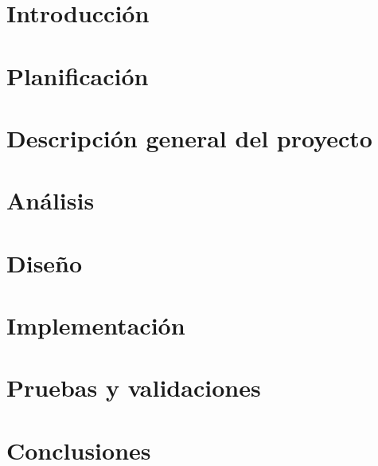 \documentclass[a4paper,11pt]{book}
\begin{document}
\renewcommand{\figurename}{Figura}
\renewcommand{\listfigurename}{Indice de figuras}
\renewcommand{\tablename}{Tabla}
\renewcommand{\listtablename}{Indice de tablas}

\pagestyle{empty}

\cleardoublepage


\cleardoublepage
\pagestyle{plain}

\frontmatter %


\cleardoublepage

\tableofcontents
\listoffigures
\listoftables

\mainmatter %

\chapter{Introducción}

\clearpage

\chapter{Planificación}

\clearpage

\chapter{Descripción general del proyecto}
%
\clearpage

\chapter{Análisis}
%
\clearpage

\chapter{Diseño}
%
\clearpage

\chapter{Implementación}
%
\clearpage

\chapter{Pruebas y validaciones}
%
\clearpage

\chapter{Conclusiones}
%
\clearpage





\clearpage

\end{document}
